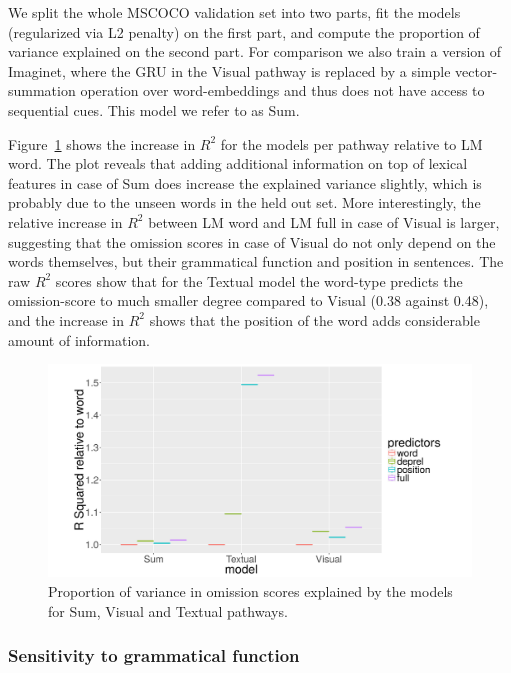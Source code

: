 \noindent We split the whole MSCOCO validation set into two parts, fit the 
models (regularized via L2 penalty) on the first part, and compute the 
proportion of variance explained on the second part. 
For comparison we also train a version of {\sc Imaginet},
where the GRU in the {\sc Visual} pathway is replaced by a simple vector-summation operation
over word-embeddings and thus does not have access to sequential cues. This
model we refer to as {\sc Sum}. 

Figure~\ref{fig:rsquared} shows the increase in $R^2$  for the models 
per pathway relative to {\sc LM word}. The plot reveals that 
adding additional information on top of lexical features in case of {\sc Sum} 
does increase the explained variance slightly, which is probably due to 
the unseen words in the held out set. More interestingly, the
relative increase in $R^2$ between {\sc LM word} and {\sc LM full} in
case of {\sc Visual} is larger, suggesting that 
the omission scores in case of {\sc Visual} do not only depend on the words themselves,
but their grammatical function and position in sentences.  The raw  $R^2$
scores show that for the {\sc Textual} model the word-type predicts the omission-score
to much smaller degree compared to {\sc Visual} (0.38 against 0.48), and the 
increase in $R^2$ shows that the position of the word adds considerable 
amount of information.

\begin{figure}
\centering
  \includegraphics[scale=0.35]{omission-stat/position-new.png}
\caption{Proportion of variance in omission scores explained by the models
 for {\sc Sum}, {\sc Visual} and {\sc Textual} pathways.}
\label{fig:rsquared}
\end{figure}


\subsubsection{Sensitivity to grammatical function}
\label{sec:gramfunc}


